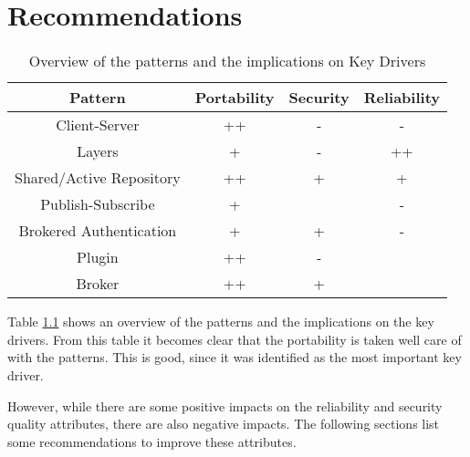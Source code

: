 
\clearpage
\chapter{Recommendations}
\label{ch:recommendations}
%

\begin{center}
\begin{table}[H]
\label{tab:qa-overview}
\caption{Overview of the patterns and the implications on Key Drivers}
\begin{tabular}{|c|c|c|c|}
\hline \textbf{Pattern} & \textbf{Portability} & \textbf{Security} & \textbf{Reliability} \\ 
\hline Client-Server & ++ & - & - \\ 
\hline Layers & + & - & ++ \\ 
\hline Shared/Active Repository & ++ & + & + \\ 
\hline Publish-Subscribe & + &  & - \\ 
\hline Brokered Authentication & + & + & - \\ 
\hline Plugin & ++ & - &  \\ 
\hline Broker & ++ & + &  \\ 
\hline 
\end{tabular} 

\end{table}
\end{center}
Table \ref{tab:qa-overview} shows an overview of the patterns and the implications on the key drivers. From this table it becomes clear that the portability is taken well care of with the patterns. This is good, since it was identified as the most important key driver.

However, while there are some positive impacts on the reliability and security quality attributes, there are also negative impacts. The following sections list some recommendations to improve these attributes.

